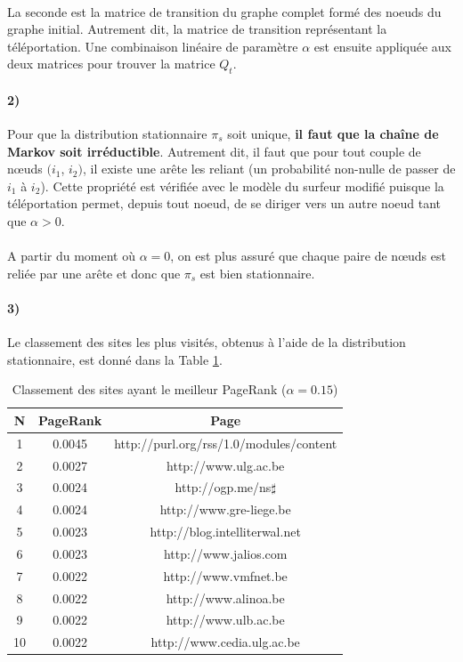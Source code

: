 \documentclass[a4paper,titlepage]{report}
\begin{document}
\paragraph{}
La seconde est la matrice de transition du graphe complet formé des noeuds du graphe initial. Autrement dit, la matrice de transition représentant la téléportation. Une combinaison linéaire de paramètre $\alpha$ est ensuite appliquée aux deux matrices pour trouver la matrice $Q_t$.
\paragraph{2)}
Pour que la distribution stationnaire $\pi_s$ soit unique, \textbf{il faut que la chaîne de Markov soit irréductible}. Autrement dit, il faut que pour tout couple de nœuds $(i_1$, $i_2)$, il existe une arête les reliant (un probabilité non-nulle de passer de $i_1$ à $i_2$). Cette propriété est vérifiée avec le modèle du surfeur modifié puisque la téléportation permet, depuis tout noeud, de se diriger vers un autre noeud tant que $\alpha > 0$. 
\paragraph{}
A partir du moment où $\alpha = 0$, on est plus assuré que chaque paire de nœuds est reliée par une arête et donc que $\pi_s$ est bien stationnaire.
\paragraph{3)} 
Le classement des sites les plus visités, obtenus à l'aide de la distribution stationnaire, est donné dans la Table \ref{tab:best_page_rank}.
\begin{table}[h]
	\center
	\begin{tabular}{|c|c|c|}
		\hline
		N\degre & PageRank & Page \\
		\hline
		1 & 0.0045 & http://purl.org/rss/1.0/modules/content \\
		2 & 0.0027 & http://www.ulg.ac.be \\
		3 & 0.0024 & http://ogp.me/ns$\sharp$ \\
		4 & 0.0024 & http://www.gre-liege.be  \\
		5 & 0.0023 & http://blog.intelliterwal.net  \\
		6 & 0.0023 & http://www.jalios.com  \\
		7 & 0.0022 & http://www.vmfnet.be  \\
		8 & 0.0022 & http://www.alinoa.be  \\
		9 & 0.0022 & http://www.ulb.ac.be  \\
		10 & 0.0022 & http://www.cedia.ulg.ac.be  \\
		\hline
	\end{tabular}
	\caption{Classement des sites ayant le meilleur PageRank ($\alpha = 0.15$)}
	\label{tab:best_page_rank}
\end{table}
\end{document}
